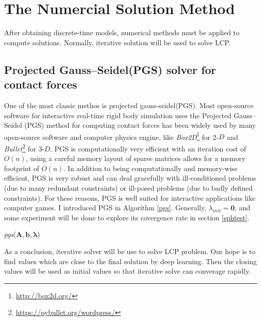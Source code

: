 \section{The Numercial Solution Method}
    After obtaining discrete-time models, numerical methods must be applied to compute solutions. Normally, iterative solution will be used to solve LCP. 

    \subsection{Projected Gauss–Seidel(PGS) solver for contact forces}
    One of the most classic methos is projected gauss-seidel(PGS). Most open-source software for interactive real-time rigid body simulation uses the Projected Gauss–Seidel (PGS) method for computing contact forces has been widely used by many open-source software and computer physics engine, like \textit{Box2D}\footnote{\url{http://box2d.org/}} for 2-$D$ and \textit{Bullet}\footnote{\url{https://pybullet.org/wordpress/}} for 3-$D$. PGS is computationally very efficient with an iteration cost of $O(n)$, using a careful memory layout of sparse matrices allows for a memory footprint of $O(n)$. In addition to being computationally and memory-wise efficient, PGS is very robust and can deal gracefully with ill-conditioned problems (due to many redundant constraints) or ill-posed problems (due to badly defined constraints). For these reasons, PGS is well suited for interactive applications like computer games. I introduced PGS in Algorithm \ref{pgs}. Generally, $\lambda_{init} = \pmb{0}$, and some experiment will be done to explore its covergence rate in section \ref{sphtest}.
    \begin{algorithm}[!h]
        \caption{\textit{pgs}($\pmb{A}, \pmb{b}, \pmb{\lambda}$)}
        \label{pgs}
    \end{algorithm}

    As a conclusion, iterative solver will be use to solve LCP problem. Our hope is to find values which are close to the final solution by deep learning. Then the closing values will be used as initial values so that iterative solve can converage rapidly.